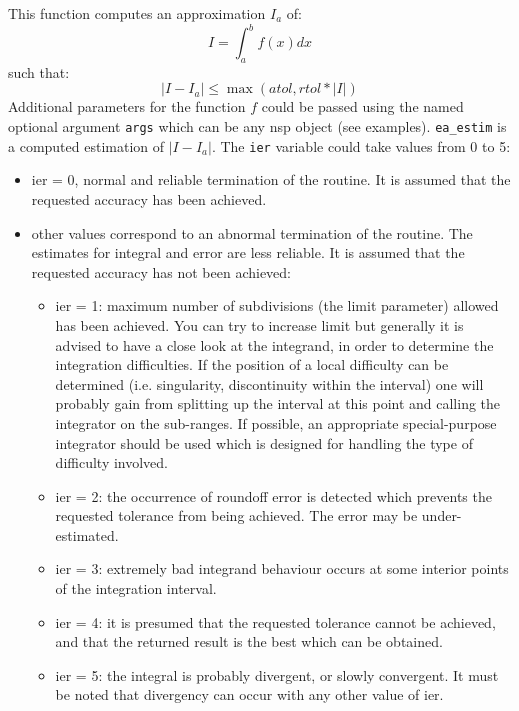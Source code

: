 \begin{mandescription}
This function computes an approximation $I_a$ of:
$$
   I = \int_a^b f(x) dx
$$
such that:
$$
   | I - I_a | \le  \max (atol, rtol*|I|)
$$
Additional parameters for the function $f$ could be passed using the
named optional argument \verb+args+ which can be any nsp object (see
examples). \verb+ea_estim+ is a computed estimation of $| I - I_a |$. The
\verb+ier+ variable could take values from 0 to 5: 
\begin{itemize}
\item ier = 0,  normal and reliable termination of the routine. It is assumed that the
      requested  accuracy has been achieved.
\item other values correspond to an abnormal termination of the routine. The estimates
      for integral and error are less reliable. It is assumed that the  requested accuracy
      has not been achieved:
      \begin{itemize}
      \item ier = 1: maximum number of subdivisions (the limit
            parameter) allowed has been achieved. You can try to
            increase limit but generally it is advised to have a close look at the
            integrand, in order to determine the integration
            difficulties. If the position of a local difficulty can
            be determined (i.e.  singularity, discontinuity within
            the interval) one will probably gain from  splitting up
            the interval at this point and calling the integrator
            on the sub-ranges. If possible, an appropriate
            special-purpose integrator should be used which is
            designed for handling the type  of difficulty involved.
      \item ier = 2: the occurrence of roundoff error is detected
            which prevents the requested tolerance from being
            achieved. The error may be under-estimated.
      \item ier = 3: extremely bad integrand behaviour occurs at 
            some interior points of the integration interval.
      \item ier = 4: it is presumed that the requested tolerance 
            cannot be achieved, and that the returned result is the
            best which can be obtained.
      \item ier = 5: the integral is probably divergent, or slowly
            convergent. It must be noted that divergency can occur with
            any other value of ier.
      \end{itemize}
\end{itemize}

\end{mandescription}

